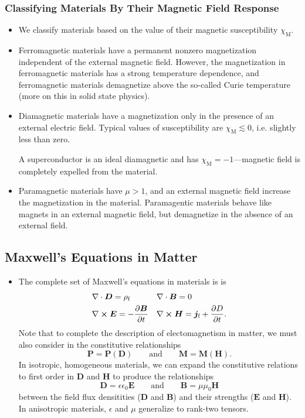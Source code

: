 \documentclass[11pt, a4paper]{article}
\renewcommand{\vec}[1]{\bm{#1}} %
\newcommand{\E}{\vec{E}} %
\newcommand{\D}{\vec{D}}  %
\newcommand{\B}{\vec{B}} %
\renewcommand{\H}{\vec{H}}  %
\renewcommand{\P}{\vec{P}}  %
\newcommand{\M}{\vec{M}}  %
\newcommand{\e}{\epsilon}
\newcommand{\ee}{\epsilon_{0}}  %
\newcommand{\mm}{\mu_{0}}  %
\renewcommand{\j}{\vec{j}}  %
\renewcommand{\div}{\nabla \cdot}
\renewcommand{\curl}{\nabla \cross}
\begin{document}
\subsubsection{Classifying Materials By Their Magnetic Field Response}
\begin{itemize}
	\item We classify materials based on the value of their magnetic susceptibility $ \chi_{\text{M}} $. 
	
	\item Ferromagnetic materials have a permanent nonzero magnetization independent of the external magnetic field. However, the magnetization in ferromagnetic materials has a strong temperature dependence, and ferromagnetic materials demagnetize above the so-called Curie temperature (more on this in solid state physics).
	
    \item Diamagnetic materials have a magnetization only in the presence of an external electric field. Typical values of susceptibility are $ \chi_{\text{M}} \lesssim 0 $, i.e. slightly less than zero.
	
	A superconductor is an ideal diamagnetic and has $ \chi_{\text{M}} = -1 $---magnetic field is completely expelled from the material.
	
	\item Paramagnetic materials have $ \mu > 1 $, and an external magnetic field increase the magnetization in the material. Paramagentic materials behave like magnets in an external magnetic field, but demagnetize in the absence of an external field. 
\end{itemize}

\subsection{Maxwell's Equations in Matter}
\begin{itemize}
	\item The complete set of Maxwell's equations in materials is is
	\begin{align*}
		& \div \D = \rho_{\text{f}} && \div \B = 0\\
		& \curl \E = - \pdv{\B}{t} &&  \curl \H = \j_{\text{f}} + \pdv{D}{t}.
	\end{align*}
	Note that to complete the description of electomagnetism in matter, we must also consider in the constitutive relationships
    \begin{equation*}
        \P = \P(\D) \qquad \text{and} \qquad \M = \M(\H).
    \end{equation*}
    In isotropic, homogeneous materials, we can expand the constitutive relations to first order in $ \D $ and $ \H $ to produce the relationships
    \begin{equation*}
        \D = \e \ee \E \qquad \text{and} \qquad \B = \mu \mm \H
    \end{equation*}
    between the field flux densitities ($ \D $ and $ \B $) and their strengths ($ \E $ and $ \H $).
	In anisotropic materials, $ \e $ and $ \mu $  generalize to rank-two tensors.
	
\end{itemize}
\end{document}
